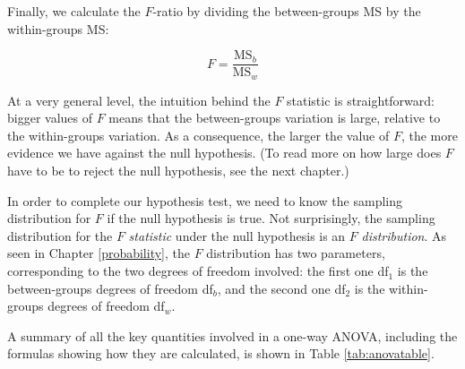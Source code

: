 \documentclass[
  11pt,
  a4paper,
  twoside,symmetric,openright]{book}
\theoremstyle{break}
\theoremstyle{break}
\begin{document}
Finally, we calculate the \(F\)-ratio by dividing the between-groups MS by the within-groups MS:

\[
F = \frac{\mbox{MS}_b }{ \mbox{MS}_w } 
\]

At a very general level, the intuition behind the \(F\) statistic is straightforward: bigger values of \(F\) means that the between-groups variation is large, relative to the within-groups variation. As a consequence, the larger the value of \(F\), the more evidence we have against the null hypothesis. (To read more on how large does \(F\) have to be to reject the null hypothesis, see the next chapter.)

In order to complete our hypothesis test, we need to know the sampling distribution for \(F\) if the null hypothesis is true. Not surprisingly, the sampling distribution for the \(F\) \emph{statistic} under the null hypothesis is an \(F\) \emph{distribution}. As seen in Chapter \ref{probability}, the \(F\) distribution has two parameters, corresponding to the two degrees of freedom involved: the first one df\(_1\) is the between-groups degrees of freedom df\(_b\), and the second one df\(_2\) is the within-groups degrees of freedom df\(_w\).

A summary of all the key quantities involved in a one-way ANOVA, including the formulas showing how they are calculated, is shown in Table \ref{tab:anovatable}.
\end{document}
